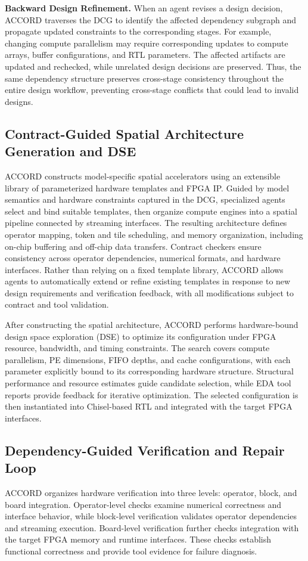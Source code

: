 \documentclass[conference]{IEEEtran}
\begin{document}
\noindent\textbf{Backward Design Refinement.}
When an agent revises a design decision, ACCORD traverses the DCG to identify the affected dependency subgraph and propagate updated constraints to the corresponding stages. For example, changing compute parallelism may require corresponding updates to compute arrays, buffer configurations, and RTL parameters. The affected artifacts are updated and rechecked, while unrelated design decisions are preserved. Thus, the same dependency structure preserves cross-stage consistency throughout the entire design workflow, preventing cross-stage conflicts that could lead to invalid designs.

\subsection{Contract-Guided Spatial Architecture Generation and DSE}
ACCORD constructs model-specific spatial accelerators using an extensible library of parameterized hardware templates and FPGA IP. Guided by model semantics and hardware constraints captured in the DCG, specialized agents select and bind suitable templates, then organize compute engines into a spatial pipeline connected by streaming interfaces. The resulting architecture defines operator mapping, token and tile scheduling, and memory organization, including on-chip buffering and off-chip data transfers. Contract checkers ensure consistency across operator dependencies, numerical formats, and hardware interfaces. Rather than relying on a fixed template library, ACCORD allows agents to automatically extend or refine existing templates in response to new design requirements and verification feedback, with all modifications subject to contract and tool validation.

After constructing the spatial architecture, ACCORD performs hardware-bound design space exploration (DSE) to optimize its configuration under FPGA resource, bandwidth, and timing constraints. The search covers compute parallelism, PE dimensions, FIFO depths, and cache configurations, with each parameter explicitly bound to its corresponding hardware structure. Structural performance and resource estimates guide candidate selection, while EDA tool reports provide feedback for iterative optimization. The selected configuration is then instantiated into Chisel-based RTL and integrated with the target FPGA interfaces.

\subsection{Dependency-Guided Verification and Repair Loop}
ACCORD organizes hardware verification into three levels: operator, block, and board integration. Operator-level checks examine numerical correctness and interface behavior, while block-level verification validates operator dependencies and streaming execution. Board-level verification further checks integration with the target FPGA memory and runtime interfaces. These checks establish functional correctness and provide tool evidence for failure diagnosis.
\end{document}
